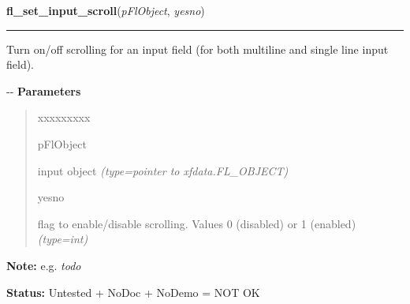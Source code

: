 \hspace{.8\funcindent}\begin{boxedminipage}{\funcwidth}

    \raggedright \textbf{fl\_set\_input\_scroll}(\textit{pFlObject}, \textit{yesno})

    \vspace{-1.5ex}

    \rule{\textwidth}{0.5\fboxrule}
\setlength{\parskip}{2ex}

Turn on/off scrolling for an input field (for both multiline and single
line input field).

-{}-
\setlength{\parskip}{1ex}
      \textbf{Parameters}
      \vspace{-1ex}

      \begin{quote}
        \begin{Ventry}{xxxxxxxxx}

          \item[pFlObject]


input object
            {\it (type=pointer to xfdata.FL\_OBJECT)}

          \item[yesno]


flag to enable/disable scrolling. Values 0 (disabled) or 1 (enabled)
            {\it (type=int)}

        \end{Ventry}

      \end{quote}

\textbf{Note:} 
e.g. \emph{todo}


\textbf{Status:} 
Untested + NoDoc + NoDemo = NOT OK


    \end{boxedminipage}

    \label{xformslib:flinput:fl_set_input_cursorpos}

    \vspace{0.5ex}

